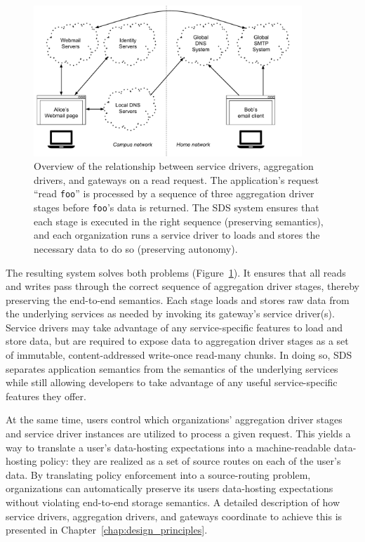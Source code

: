 \begin{figure}[h]
   \centering
   \includegraphics[width=0.9\textwidth,page=33]{figures/dissertation-figures}
   \caption{Overview of the relationship between service drivers, aggregation
   drivers, and gateways on a read request.  The application's request ``read \texttt{foo}'' is
   processed by a sequence of three aggregation driver stages before
   \texttt{foo}'s data is returned.  The SDS system ensures that each stage is
   executed in the right sequence (preserving semantics),
   and each organization runs a service driver to loads and stores the
   necessary data to do so (preserving autonomy).}
   \label{fig:chap1-sds-implementation-overview}
\end{figure}

The resulting system solves both problems
(Figure~\ref{fig:chap1-sds-implementation-overview}).
It ensures that all reads and writes pass through the
correct sequence of aggregation driver
stages, thereby preserving the end-to-end semantics.  Each stage
loads and stores raw data from the underlying services as needed
by invoking its gateway's service driver(s).  Service drivers may take advantage
of any service-specific features to load and store data, but are required to
expose data to aggregation driver stages as a set of immutable,
content-addressed write-once read-many chunks.  In doing so, SDS separates
application semantics from the semantics of the underlying services while still
allowing developers to take advantage of any useful service-specific
features they offer.

At the same time, users 
control which organizations' aggregation driver stages and service driver
instances are utilized to process a given request.  This yields a way to
translate a user's data-hosting expectations into a
machine-readable data-hosting policy:  they are realized as a set of source
routes on each of the user's data.  By translating policy enforcement into
a source-routing problem, organizations can automatically
preserve its users data-hosting expectations without
violating end-to-end storage semantics.  A detailed description
of how service drivers, aggregation
drivers, and gateways coordinate to achieve this is presented in
Chapter~\ref{chap:design_principles}.

